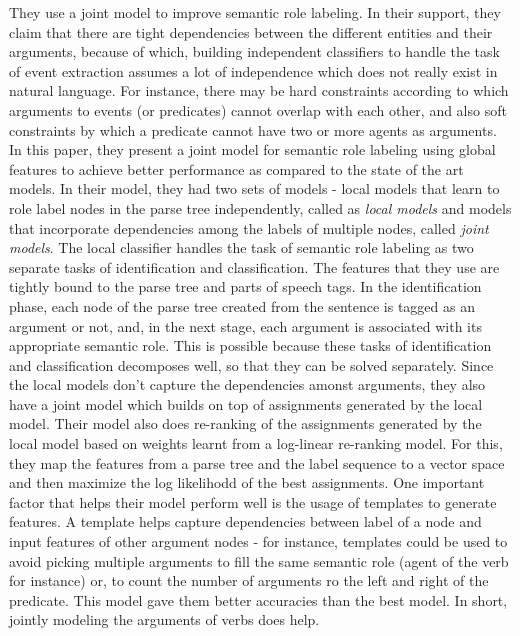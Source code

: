 They use a joint model to improve semantic role labeling. In their support, they claim that there are tight dependencies between the different entities and their arguments, because of which, building independent classifiers to handle the task of event extraction assumes a lot of independence which does not really exist in natural language. For instance, there may be hard constraints according to which arguments to events (or predicates) cannot overlap with each other, and also soft constraints by which a predicate cannot have two or more agents as arguments. In this paper, they present a joint model for semantic role labeling using global features to achieve better performance as compared to the state of the art models. In their model, they had two sets of models - local models that learn to role label nodes in the parse tree independently, called as \emph{local models} and models that incorporate dependencies among the labels of multiple nodes, called \emph{joint models}. The local classifier handles the task of semantic role labeling as two separate tasks of identification and classification. The features that they use are tightly bound to the parse tree and parts of speech tags. In the identification phase, each node of the parse tree created from the sentence is tagged as an argument or not, and, in the next stage, each argument is associated with its appropriate semantic role. This is possible because these tasks of identification and classification decomposes well, so that they can be solved separately. Since the local models don't capture the dependencies amonst arguments, they also have a joint model which builds on top of assignments generated by the local model. Their model also does re-ranking of the assignments generated by the local model based on weights learnt from a log-linear re-ranking model. For this, they map the features from a parse tree and the label sequence to a vector space and then maximize the log likelihodd of the best assignments. One important factor that helps their model perform well is the usage of templates to generate features. A template helps capture dependencies between label of a node and input features of other argument nodes - for instance, templates could be used to avoid picking multiple arguments to fill the same semantic role (agent of the verb for instance) or, to count the number of arguments ro the left and right of the predicate. This model gave them better accuracies than the best model. In short, jointly modeling the arguments of verbs does help.

